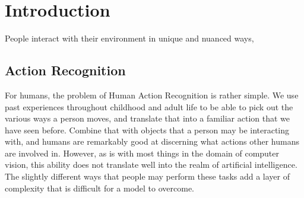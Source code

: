 
\chapter{Introduction} %

\label{Chapter1} %




People interact with their environment in unique and nuanced ways, 

\section{Action Recognition}

For humans, the problem of Human Action Recognition is rather simple. We use past experiences throughout childhood and adult life to be able to pick out the various ways a person moves, and translate that into a familiar action that we have seen before. Combine that with objects that a person may be interacting with, and humans are remarkably good at discerning what actions other humans are involved in. However, as is with most things in the domain of computer vision, this ability does not translate well into the realm of artificial intelligence. The slightly different ways that people may perform these tasks add a layer of complexity that is difficult for a model to overcome.


